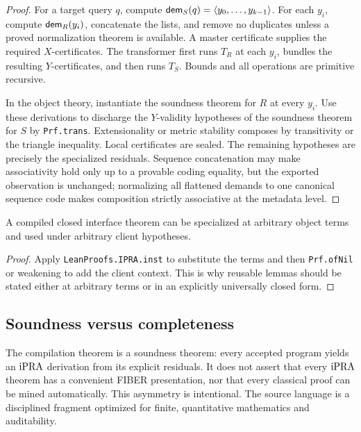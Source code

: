 \begin{proof}
For a target query \(q\), compute \(\mathsf{dem}_S(q)=\langle y_0,\ldots,y_{k-1}\rangle\).
For each \(y_i\), compute \(\mathsf{dem}_R(y_i)\), concatenate the lists, and remove
no duplicates unless a proved normalization theorem is available.  A master
certificate supplies the required \(X\)-certificates.  The transformer first
runs \(T_R\) at each \(y_i\), bundles the resulting \(Y\)-certificates, and
then runs \(T_S\).  Bounds and all operations are primitive recursive.

In the object theory, instantiate the soundness theorem for \(R\) at every
\(y_i\).  Use these derivations to discharge the \(Y\)-validity hypotheses of
the soundness theorem for \(S\) by \texttt{Prf.trans}.  Extensionality or
metric stability composes by transitivity or the triangle inequality.  Local
certificates are sealed.  The remaining hypotheses are precisely the
specialized residuals.  Sequence concatenation may make associativity hold
only up to a provable coding equality, but the exported observation is
unchanged; normalizing all flattened demands to one canonical sequence code
makes composition strictly associative at the metadata level.
\end{proof}

\begin{corollary}
A compiled closed interface theorem can be specialized at arbitrary object
terms and used under arbitrary client hypotheses.
\end{corollary}

\begin{proof}
Apply \texttt{LeanProofs.IPRA.inst} to substitute the terms and then
\texttt{Prf.ofNil} or weakening to add the client context.  This is why reusable
lemmas should be stated either at arbitrary terms or in an explicitly
universally closed form.
\end{proof}

\subsection{Soundness versus completeness}

The compilation theorem is a soundness theorem: every accepted program yields
an \(\mathrm{iPRA}\) derivation from its explicit residuals.  It does not assert that
every \(\mathrm{iPRA}\) theorem has a convenient FIBER presentation, nor that every
classical proof can be mined automatically.  This asymmetry is intentional.
The source language is a disciplined fragment optimized for finite,
quantitative mathematics and auditability.

